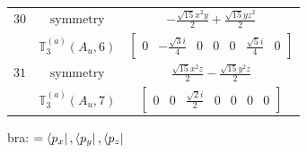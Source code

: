 \documentclass[fleqn,8pt,landscape]{jsarticle}
\begin{document}
\begin{longtable}{ccc}
$ 30 $ & $ \text{symmetry} $ & $ - \frac{\sqrt{15} x^{2} y}{2} + \frac{\sqrt{15} y z^{2}}{2} $ \\
$  $ & $ \mathbb{T}_{3}^{(a)}(A_{u},6) $ & $ \begin{bmatrix} 0 & - \frac{\sqrt{3} i}{4} & 0 & 0 & 0 & \frac{\sqrt{5} i}{4} & 0 \end{bmatrix} $ \\ \hline
$ 31 $ & $ \text{symmetry} $ & $ \frac{\sqrt{15} x^{2} z}{2} - \frac{\sqrt{15} y^{2} z}{2} $ \\
$  $ & $ \mathbb{T}_{3}^{(a)}(A_{u},7) $ & $ \begin{bmatrix} 0 & 0 & \frac{\sqrt{2} i}{2} & 0 & 0 & 0 & 0 \end{bmatrix} $ \\ \hline
\end{longtable}
bra: $=\bra{p_{x}}, \bra{p_{y}}, \bra{p_{z}}$
\end{document}
